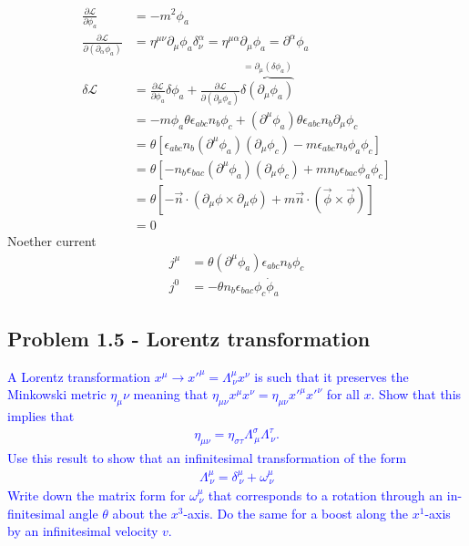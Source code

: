 \documentclass[../main.tex]{subfiles}
\begin{document}
\begin{align}
\frac{\partial \mathcal{L}}{\partial\phi_a}
&=-m^2\phi_a\\
\frac{\partial \mathcal{L}}{\partial(\partial_\alpha\phi_a)}
&=\eta^{\mu\nu}\partial_\mu\phi_a\delta^\alpha_\nu
=\eta^{\mu\alpha}\partial_\mu\phi_a
=\partial^\alpha\phi_a\\
\delta\mathcal{L}
&=\frac{\partial\mathcal{L}}{\partial\phi_a}\delta\phi_a+\frac{\partial\mathcal{L}}{\partial(\partial_\mu\phi_a)}\overbrace{\delta(\partial_\mu\phi_a)}^{=\partial_\mu(\delta\phi_a)}\\
&=-m\phi_a\theta\epsilon_{abc}n_b\phi_c+(\partial^\mu\phi_a)\theta\epsilon_{abc}n_b\partial_\mu\phi_c\\
&=\theta[\epsilon_{abc}n_b(\partial^\mu\phi_a)(\partial_\mu\phi_c)-m\epsilon_{abc}n_b\phi_a\phi_c]\\
&=\theta[-n_b\epsilon_{bac}(\partial^\mu\phi_a)(\partial_\mu\phi_c)+m n_b\epsilon_{bac}\phi_a\phi_c]\\
&=\theta[-\vec{n}\cdot(\partial_\mu\phi\times\partial_\mu\phi)+m\vec{n}\cdot(\vec{\phi}\times\vec{\phi})]\\
&=0
\end{align}
Noether current
\begin{align}
j^\mu&=\theta(\partial^\mu\phi_a)\epsilon_{abc}n_b\phi_c\\
j^0&=-\theta n_b\epsilon_{bac}\phi_c\dot{\phi}_a
\end{align}

\subsection{Problem 1.5 - Lorentz transformation}

\textcolor{blue}{
A Lorentz transformation $x^\mu\rightarrow  x'^\mu=\Lambda^\mu_{\,\nu}x^\nu$ is such that it preserves the Minkowski metric $\eta_\mu\nu$ meaning that $\eta_{\mu\nu}x^\mu x^\nu=\eta_{\mu\nu}x'^\mu x'^\nu$ for all $x$. Show that this implies that
\begin{align}
\eta_{\mu\nu}=\eta_{\sigma\tau}\Lambda^\sigma_{\,\mu}\Lambda^\tau_{\,\nu}.
\end{align}
Use this result to show that an infinitesimal transformation of the form
\begin{align}
\Lambda^\mu_{\,\nu}=\delta^\mu_{\,\nu}+\omega^\mu_{\,\nu}
\end{align}
Write down the matrix form for $\omega^\mu_{\,\nu}$ that corresponds to a rotation through an in-
finitesimal angle $\theta$ about the $x^3$-axis. Do the same for a boost along the $x^1$-axis by an
infinitesimal velocity $v$.
}\newline
\end{document}
